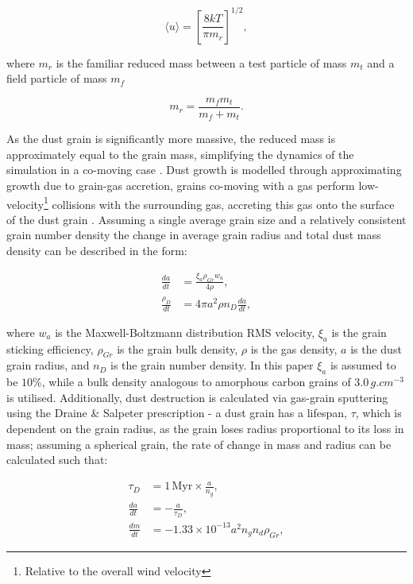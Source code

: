 \begin{equation}
  \langle u \rangle = \left[ \frac{8kT}{\pi m_r} \right] ^{1/2} ,
\end{equation}

where $m_r$ is the familiar reduced mass between a test particle of mass $m_t$ and a field particle of mass $m_f$

\begin{equation}
  m_r = \frac{m_f m_t}{m_f + m_t} .
\end{equation}

As the dust grain is significantly more massive, the reduced mass is approximately equal to the grain mass, simplifying the dynamics of the simulation in a co-moving case \parencite{spitzer_jr._physical_2008}.
Dust growth is modelled through approximating growth due to grain-gas accretion, grains co-moving with a gas perform low-velocity\footnote{Relative to the overall wind velocity} collisions with the surrounding gas, accreting this gas onto the surface of the dust grain \parencite{spitzer_jr._physical_2008}.
Assuming a single average grain size and a relatively consistent grain number density the change in average grain radius and total dust mass density can be described in the form:

\begin{subequations}
  \begin{align}
        \frac{da}{dt} & = \frac{\xi_a \rho_{Gr} w_a}{4 \rho} , \\
    \frac{\rho_D}{dt} & = 4 \pi a^2 \rho n_D \frac{da}{dt}   , 
  \end{align}
\end{subequations}

where $w_a$ is the Maxwell-Boltzmann distribution RMS velocity, $\xi_a$ is the grain sticking efficiency, $\rho_{Gr}$ is the grain bulk density, $\rho$ is the gas density, $a$ is the dust grain radius, and $n_D$ is the grain number density.
In this paper $\xi_a$ is assumed to be $10\%$, while a bulk density analogous to amorphous carbon grains of $3.0 \, \si{g.cm^{-3}}$ is utilised.
Additionally, dust destruction is calculated via gas-grain sputtering using the Draine \& Salpeter prescription - a dust grain has a lifespan, $\tau$, which is dependent on the grain radius, as the grain loses radius proportional to its loss in mass; assuming a spherical grain, the rate of change in mass and radius can be calculated such that:

\begin{subequations}
  \begin{align}
           \tau_D & = 1 \, \text{Myr} \times \frac{a}{n_g} , \\
    \frac{da}{dt} & = - \frac{a}{\tau_D} , \\
    \frac{dm}{dt} & = -1.33 \times 10^{-13} a^2 n_g n_d \rho_{Gr} ,
  \end{align}
\end{subequations}

